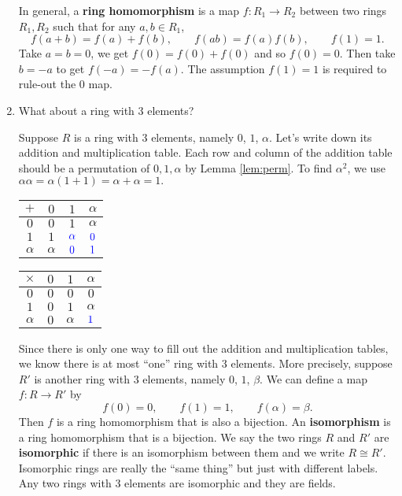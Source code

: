 \documentclass{article}
\newcommand{\add}[1]{{\color{blue} #1}}
\begin{document}
\begin{enumerate}
    In general, a \textbf{ring homomorphism} is a map $f:R_1\rightarrow R_2$ between two rings $R_1,R_2$ such that for any $a,b\in R_1$, $$f(a+b) = f(a) + f(b),\qquad f(ab) = f(a)f(b),\qquad f(1) = 1.$$
    Take $a = b = 0$, we get $f(0) = f(0) + f(0)$ and so $f(0) = 0$. Then take $b = -a$ to get $f(-a) = -f(a)$. The assumption $f(1) = 1$ is required to rule-out the $0$ map.

    \item What about a ring with 3 elements?

    Suppose $R$ is a ring with 3 elements, namely $0$, $1$, $\alpha$. Let's write down its addition and multiplication table. Each row and column of the addition table should be a permutation of $0,1,\alpha$ by Lemma \ref{lem:perm}. To find $\alpha^2$, we use $\alpha\alpha = \alpha(1+1) = \alpha + \alpha = 1.$
    \begin{center}
    \begin{tabular}{c|c|c|c}
             $+$&$0$&$1$&$\alpha$  \\ \hline
             $0$&$0$&$1$&$\alpha$  \\ \hline
             $1$&$1$&$\add{\alpha}$&$\add{0}$  \\ \hline
             $\alpha$&$\alpha$&$\add{0}$&$\add{1}$  
    \end{tabular}
    \hspace{50pt}
    \begin{tabular}{c|c|c|c}
             $\times$&$0$&$1$&$\alpha$  \\ \hline
             $0$&$0$&$0$&$0$  \\ \hline
             $1$&$0$&$1$&$\alpha$  \\ \hline
             $\alpha$&$0$&$\alpha$&$\add{1}$  
    \end{tabular}
    \end{center}
    Since there is only one way to fill out the addition and multiplication tables, we know there is at most ``one'' ring with 3 elements. More precisely, suppose $R'$ is another ring with $3$ elements, namely $0$, $1$, $\beta$. We can define a map $f:R\rightarrow R'$ by $$f(0) = 0,\qquad f(1) = 1,\qquad f(\alpha) = \beta.$$
    Then $f$ is a ring homomorphism that is also a bijection. An \textbf{isomorphism} is a ring homomorphism that is a bijection. We say the two rings $R$ and $R'$ are \textbf{isomorphic} if there is an isomorphism between them and we write $R\cong R'$. Isomorphic rings are really the ``same thing'' but just with different labels. Any two rings with $3$ elements are isomorphic and they are fields.


\end{enumerate}
\end{document}
